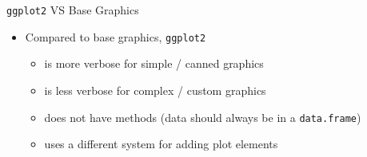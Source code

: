 \documentclass[table,smaller]{beamer}
\begin{document}
\begin{frame}[fragile,label=sec-1-7]{\texttt{ggplot2} VS Base Graphics}
 \begin{itemize}
\item Compared to base graphics, \texttt{ggplot2}
\begin{itemize}
\item is more verbose for simple / canned graphics
\item is less verbose for complex / custom graphics
\item does not have methods (data should always be in a \texttt{data.frame})
\item uses a different system for adding plot elements
\end{itemize}
\end{itemize}
\end{frame}
\end{document}
